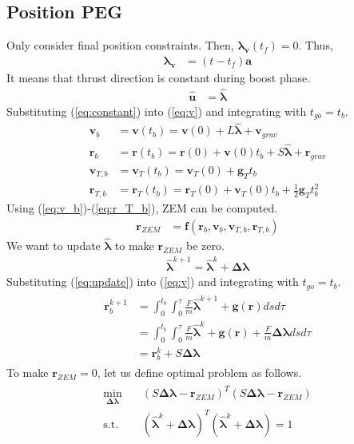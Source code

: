 \documentclass{fdclreport}
\begin{document}
\subsection{Position PEG}
Only consider final position constraints. Then, $\bm{\lambda_v}(t_f) = 0$. Thus,
\begin{align}
	\bm{\lambda_v} &= (t - t_{f})\bm{a}
\end{align}
It means that thrust direction is constant during boost phase.
\begin{align}
	\bm{\hat{u}} &= \bm{\hat{\lambda}} \label{eq:constant}
\end{align}
Substituting (\ref{eq:constant}) into (\ref{eq:v}) and integrating with $t_{go}=t_b$.
\begin{align}
	\bm{v}_b &= \bm{v}(t_b) = \bm{v}(0) + L \bm{\hat{\lambda}} + \bm{v}_{grav} \label{eq:v_b} \\ 
	\bm{r}_b &= \bm{r}(t_b) = \bm{r}(0) + \bm{v}(0)t_b + S \bm{\hat{\lambda}} + \bm{r}_{grav} \label{eq:r_b}\\ 
	\bm{v}_{T,b} &= \bm{v}_T(t_b) = \bm{v}_T(0) + \bm{g}_T t_b \label{eq:v_T_b} \\ 
	\bm{r}_{T,b} &= \bm{r}_T(t_b) = \bm{r}_T(0) + \bm{v}_T(0) t_b + \frac{1}{2}\bm{g}_T t_b^2 \label{eq:r_T_b}
\end{align}
Using (\ref{eq:v_b})-(\ref{eq:r_T_b}), ZEM can be computed.
\begin{align}
	\bm{r}_{ZEM} &= \bm{f}(\bm{r}_b, \bm{v}_b, \bm{v}_{T,b}, \bm{r}_{T,b})
\end{align}
We want to update $\bm{\hat{\lambda}}$ to make $\bm{r}_{ZEM}$ be zero.
\begin{align}
	\bm{\hat{\lambda}}^{k+1} = \bm{\hat{\lambda}}^k + \bm{\Delta \lambda} \label{eq:update}
\end{align}
Substituting (\ref{eq:update}) into (\ref{eq:v}) and integrating with $t_{go}=t_b$.
\begin{align}
\begin{split}
	\bm{r}_b^{k+1} &= \int_{0}^{t_b} \int_{0}^{\tau} \frac{F}{m} \bm{\hat{\lambda}}^{k+1} + \bm{g}(\bm{r}) ds d\tau \\
								 &= \int_{0}^{t_b} \int_{0}^{\tau} \frac{F}{m} \bm{\hat{\lambda}}^{k} + \bm{g}(\bm{r}) + \frac{F}{m} \bm{\Delta \lambda} ds d\tau \\
								 &= \bm{r}_b^{k} + S \bm{\Delta \lambda}
\end{split}
\end{align}
To make $\bm{r}_{ZEM} = 0$, let us define optimal problem as follows.
\begin{align}
	\begin{split}
	\min_{\bm{\Delta \lambda}} \quad & \left( S \bm{\Delta \lambda} - \bm{r}_{ZEM} \right)^T \left( S \bm{\Delta \lambda} - \bm{r}_{ZEM} \right) \\
	\textrm{s.t.} \quad & (\bm{\hat{\lambda}}^k + \bm{\Delta \lambda})^T (\bm{\hat{\lambda}}^k + \bm{\Delta \lambda}) = 1 \label{eq:opt}
\end{split}
\end{align}
\end{document}
